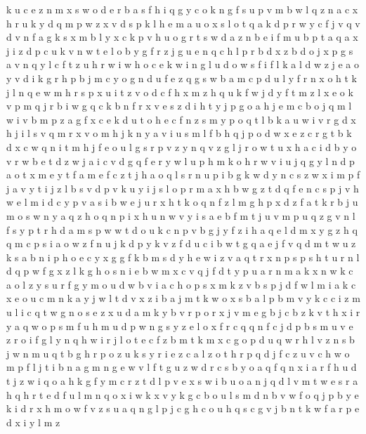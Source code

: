 \documentclass{article}
\begin{document}
k u c e z n m x s w o d
e r b a s f h i q g y c o k
n g f s u
p
v m b w l q z n a c x h r u k y d
q m p
w z x v d s p k l h e m a u o
x s l o t q a k d p r w y c f j v
q v d
v n f
a g k s x m b l
y x c k p v h u o g r t s w d a z n b e i f m
u b p t a
q a x j i z d p c u k v n w t e l o b y g f r
z j g u e n q c h l p r b
d
x z
b d o j x p g s a v n q y l c f t z u h r w i
w h o
c e k w
i n g l u d o
w s f
i f l k a
l d
w z j e a o y v d i k g r
h p b j m c y o g n d u f e
z q g s w b a m c p d u l y f r n x o h t k j
l n q e w m h r s p x u i t z v o
d c f h x m
z h q u k f w j d
y
f t m
z l x e o k v p m q j r b i w g
q c k b n f r x v e s z d i h t y j p g o
a h j e m c b o
j q m l
w i v b m p z a g f x c e k d u t o h
e c f n z s m y p o q t l b k a u w i v r g d x h j
i
l s v q m r
x v o m h j
k n y a v i u s m l f b h q j p o d w x e z c r g t
b k d x c w q n i t m h j f e o u l g s r p v z y
n q v z g l j r o w t u x h a c i d b y
o v r w b
e t d z w
j a i c v d g q f e r y w l u p h m k o
h r w v i u j q g y l n d p a o t x m
e y t f a m
e f c z t j h a o q l s r n u p i b g k w d y
n c s z w x i m p f j a v
y t i j z l b s v d
p
v k u y i j s l o p r m a x h b w g z t d q f e n c
s p j v h w e l m i
d c y p v a s i b w e j u r x h t k o q n f z l m g
h p x d z f a t k r b j u m o s w n y
a q z h o
q n p
i
x h u n w v y i s a e b f m t
j u v
m p u q z g v n l f s y
p t
r h d a m s p w
w t d o u k c n p v b g j y f z i h a q
e l d m x y g z h q
q m c p s i a o w z f n u j k d
p y k v z f d u c i b w t g q a e
j f v q d m t w u z k s a b n i p h o e c y x g
g f k b m s d y h e w i z v a q t r x n p
s p
s h t u r n l d q p w f g x
z l k g h o s n i e b w m x c v q j f d t y p u a r
n m a k
x n w k c a o l z y s u r
f g y m o u d
w b v i a c h o p s x m k z
v b s p j d f w l m i a k c x e o u
c m n k a y j w l t d v x z i b
a j m t k w o x s b
a l p b m v y k c
c i z m u
l i c q t w g n o s e z x u d a m k y b v r p
o r x j v m e g b
j c b z k v t h x i r y a q w o p s m f u
h m u d p w n g s y z e l o x f r c q
q n f c j d p b s m u
v e z r o i f g
l y n
q h w i r j l o t e c f z b m
t k m x c g o p d u q w r h l v z n s b
j w n m u q t b g h r p o z
u k s y r i e z c a l
z o t h r p q d j f c
z u v c h w o m p f l j t i b n a g
m n g e w
v l f t g u z w d r c s b y o a q
f q n x i a r
f h u d t j z
w i q o a
h k g f y m c r z t d l p v e x s w i b u o a n j q
d l v m t w e s r a h q
h r t e d f u l m n q o x i w k
x v y k g c b o
u l s m d n b v w f o q j p
b y e k i d r x h m o w f v z s u a q n g l p j c
g h c
o u h q s c g v j b n t k w f a r p e d x i y l m z
\end{document}

